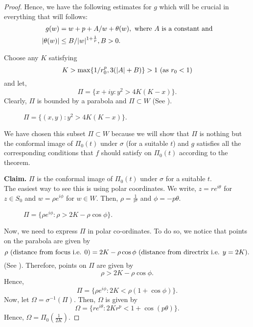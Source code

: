 \begin{proof}
	\noindent Hence, we have the following estimates 
	for \( g \) which will be crucial in everything that will follows:
	\begin{align}
		g(w)&=w+p+A /w+\theta (w),\text{ where \( A \) is a constant and} \label{eqn3.1}\\
		|\theta (w)|&\le B /|w|^{1+\frac{1}{p}}, B>0 \label{eqn3.2}
	.\end{align}

	\noindent Choose any \( K \) satisfying \[
	K>\max\{ 1 /r_0^p,3(|A|+B) \}>1 \text{ (as \( r_0<1 \))}
	\]  and let, \[
		\Pi=\{x+iy:y^2>4K(K-x)\}
	.\] Clearly, \( \Pi \) is bounded by a parabola and \( \Pi\subset W \) (See ).
\begin{figure}[ht]
    \centering
	\caption{$\Pi=\{(x,y):y^2>4K(K-x)\}$.}
    \label{parabola}
\end{figure}

	We have chosen this subset \( \Pi\subset W \) because we will show that \( \Pi \)
	is nothing but the conformal image of \( \Pi_0(t) \) under \( \sigma \) (for a suitable \( t \)) and
	\( g \) satisfies all the corresponding conditions that \( f \) should satisfy on \( \Pi_0(t) \) according to the
	theorem.\\
	\vspace{1pt}

	\noindent \textbf{Claim.} \( \Pi \) is the conformal image of \( \Pi_0(t) \) under \( \sigma \) for a suitable \( t \).\\
	The easiest way to see this is using polar coordinates. We write, \( z=re^{i\theta } \) for \( z\in S_0 \) 
	and \( w=\rho e^{i \phi } \) for \( w\in W \). Then, \( \rho=\frac{1}{r^p} \) and \( \phi=-p\theta  \).

	\begin{figure}[ht]
		\centering
		\caption{$\Pi=\{\rho e^{i\phi}:\rho>2K-\rho\cos\phi\}$.}
		\label{parabola2}
	\end{figure}
	
	Now, we need to express \( \Pi  \) in polar co-ordinates. To do so, we notice that points on the parabola are given by \[
		\rho \text{ (distance from focus i.e. \( 0 \))}= 2K-\rho \cos \phi \text{ (distance from directrix i.e. \( y=2K \))}
	.\] (See ).
	Therefore, points on \( \Pi \) are given by \[
		\rho > 2K-\rho \cos \phi 
	.\] 
	Hence, \[
		\Pi=\{\rho e^{i\phi }:2K<\rho (1+\cos \phi )\}
	.\] Now, let \( \Omega=\sigma^{-1}(\Pi) \).
	Then, \( \Omega \) is given by \[
		\Omega=\{re^{i \theta }:2Kr^p<1+\cos (p\theta )\}
.\] Hence, \( \Omega=\Pi_0\left(\frac{1}{2K}\right) \).


\end{proof}
